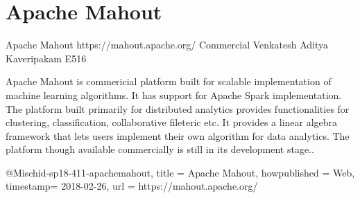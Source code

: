 \section{Apache Mahout}

Apache Mahout
https://mahout.apache.org/
Commercial
Venkatesh Aditya Kaveripakam
E516

Apache Mahout is commericial platform built for scalable implementation of
machine learning algorithms. It has support for Apache Spark implementation.
The platform built primarily for distributed analytics provides
functionalities for clustering, classification, collaborative fileteric etc.
It provides a linear algebra framework that lets users implement their own
algorithm for data analytics. The platform though available commercially is
still in its development stage.\cite{hid-sp18-411-apachemahout}.

@Misc{hid-sp18-411-apachemahout,
title = {Apache Mahout},
howpublished = {Web},
timestamp= {2018-02-26},
url = {https://mahout.apache.org/}
}